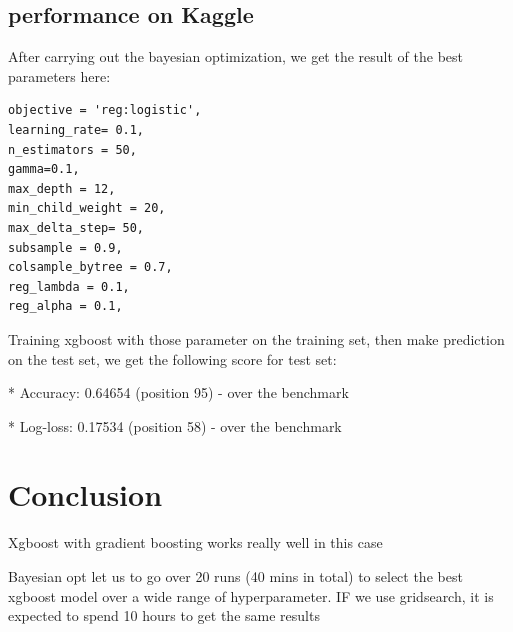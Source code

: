 \documentclass[journal,twocolumn,letterpaper]{IEEEJERM}
\begin{document}
\subsection{performance on Kaggle}

After carrying out the bayesian optimization, we get the result of the best parameters here:
\begin{verbatim}
objective = 'reg:logistic',
learning_rate= 0.1, 
n_estimators = 50,
gamma=0.1, 
max_depth = 12,
min_child_weight = 20,
max_delta_step= 50,
subsample = 0.9,
colsample_bytree = 0.7,
reg_lambda = 0.1,
reg_alpha = 0.1,
\end{verbatim}

Training xgboost with those parameter on the training set, then make prediction on the test set, we get the following score for test set:

* Accuracy: 0.64654 (position 95) - over the benchmark


* Log-loss: 0.17534 (position 58) - over the benchmark
\section{Conclusion}
Xgboost with gradient boosting works really well in this case

Bayesian opt let us to go over 20 runs (40 mins in total) to select the best xgboost model over a wide range of hyperparameter. IF we use gridsearch, it is expected to spend 10 hours to get the same results


\end{document}

